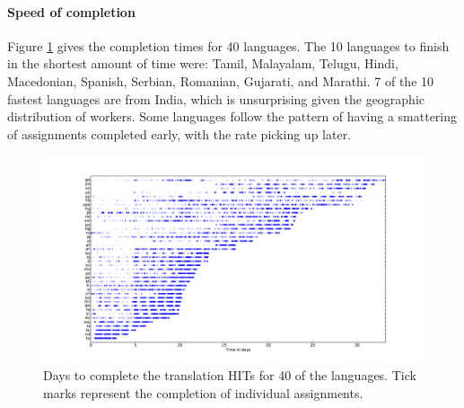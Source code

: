 \documentclass[11pt]{article}
\begin{document}
\paragraph{Speed of completion}


Figure \ref{completion-time} gives the completion times for 40 languages.  
The 10 languages to finish in the shortest amount of time were: Tamil, Malayalam, Telugu, Hindi, Macedonian, Spanish, Serbian, Romanian, Gujarati, and Marathi. 7 of the 10 fastest languages are from India, which is unsurprising given the geographic distribution of workers.  Some languages follow the pattern of having a smattering of assignments completed early, with the rate picking up later. 

\begin{figure}[h]
\includegraphics[height=\linewidth,angle=270]{final-figures/completetime}
\caption{Days to complete the translation HITs for 40 of the languages. Tick marks represent the completion of individual assignments. }
\label{completion-time}
\end{figure}
\end{document}
